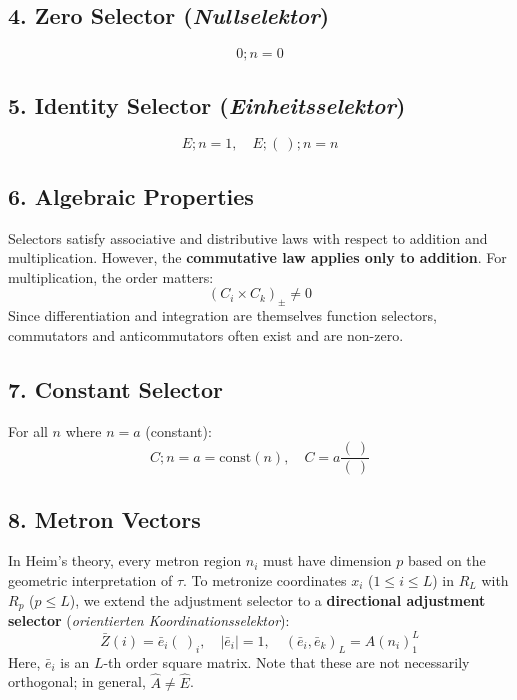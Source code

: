 \documentclass[11pt,a4paper,oneside]{article}
\begin{document}
\subsection{4. Zero Selector (\textit{Nullselektor})}
\begin{equation*}
    0; n = 0
\end{equation*}

\subsection{5. Identity Selector (\textit{Einheitsselektor})}
\begin{equation*}
    E; n = 1, \quad E; (\ ); n = n
\end{equation*}

\subsection{6. Algebraic Properties}
Selectors satisfy associative and distributive laws with respect to addition and multiplication. However, the \textbf{commutative law applies only to addition}. For multiplication, the order matters:
\begin{equation*}
    (C_i \times C_k)_{\pm} \neq 0
\end{equation*}
Since differentiation and integration are themselves function selectors, commutators and anticommutators often exist and are non-zero.

\subsection{7. Constant Selector}
For all $n$ where $n=a$ (constant):
\begin{equation}
    C; n = a = \text{const}(n), \quad C = a \frac{(\ )}{(\ )} \tag{M11a}
\end{equation}

\subsection{8. Metron Vectors}

In Heim's theory, every metron region $n_i$ must have dimension $p$ based on the geometric interpretation of $\tau$. To metronize coordinates $x_i$ ($1 \le i \le L$) in $R_L$ with $R_p$ ($p \le L$), we extend the adjustment selector to a \textbf{directional adjustment selector} (\textit{orientierten Koordinationsselektor}):
\begin{equation}
    \bar{Z}(i) = \bar{e}_i (\ )_i, \quad | \bar{e}_i | = 1, \quad (\bar{e}_i, \bar{e}_k)_L = \hat{A}(n_i)_1^L \tag{M11b}
\end{equation}
Here, $\bar{e}_i$ is an $L$-th order square matrix. Note that these are not necessarily orthogonal; in general, $\hat{A} \neq \hat{E}$.
\end{document}

